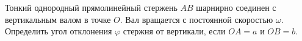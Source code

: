 Тонкий однородный прямолинейный стержень $AB$
шарнирно соединен с вертикальным валом в точке $O$.
Вал вращается с постоянной скоростью $\omega$.
Определить угол отклонения $\varphi$ стержня от вертикали,
если $OA = a$ и $OB = b$.
